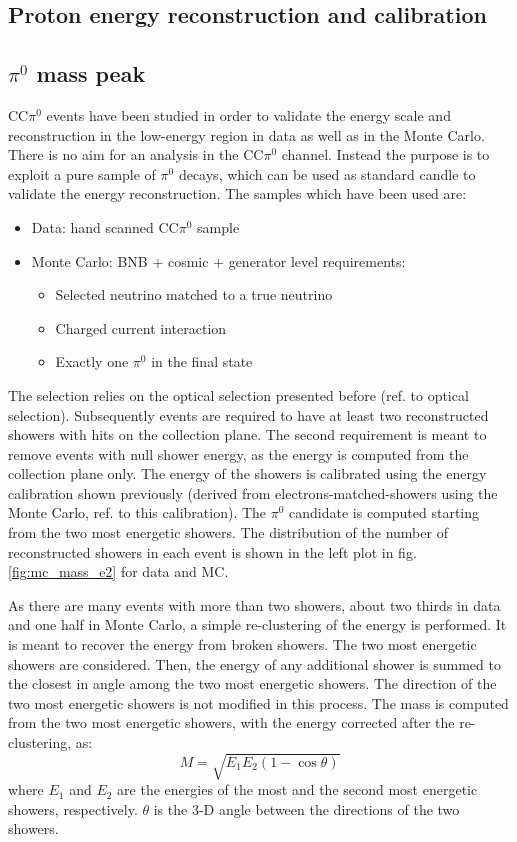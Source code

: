 \documentclass[a4paper]{article}
\begin{document}
\subsection{Proton energy reconstruction and calibration}


\subsection{\texorpdfstring{$\pi^0$}{pi0} mass peak}

CC$\pi^0$ events have been studied in order to validate the energy scale and reconstruction in the low-energy region in data as well as in the Monte Carlo. There is no aim for an analysis in the CC$\pi^0$ channel. Instead the purpose is to exploit a pure sample of $\pi^0$ decays, which can be used as standard candle to validate the energy reconstruction.
The samples which have been used are:
\begin{itemize}
  \item Data: hand scanned CC$\pi^0$ sample
  \item Monte Carlo: BNB + cosmic + generator level requirements:
  	\begin{itemize}
  		\item Selected neutrino matched to a true neutrino
		\item Charged current interaction
		\item Exactly one $\pi^0$ in the final state
  	\end{itemize}
\end{itemize}
The selection relies on the optical selection presented before (ref. to optical selection). Subsequently events are required to have at least two reconstructed showers with hits on the collection plane. The second requirement is meant to remove events with null shower energy, as the energy is computed from the collection plane only. The energy of the showers is calibrated using the energy calibration shown previously (derived from electrons-matched-showers using the Monte Carlo, ref. to this calibration).
The $\pi^0$ candidate is computed starting from the two most energetic showers. The distribution of the number of reconstructed showers in each event is shown in the left plot in fig. \ref{fig:mc_mass_e2} for data and MC.

As there are many events with more than two showers, about two thirds in data and one half in Monte Carlo, a simple re-clustering of the energy is performed. It is meant to recover the energy from broken showers. The two most energetic showers are considered. Then, the energy of any additional shower is summed to the closest in angle among the two most energetic showers. The direction of the two most energetic showers is not modified in this process. The mass is computed from the two most energetic showers, with the energy corrected after the re-clustering, as:
\[ M = \sqrt{E_1 E_2 (1 - \cos\theta)} \]\textbf{}
where $E_1$ and $E_2$ are the energies of the most and the second most energetic showers, respectively. $\theta$ is the 3-D angle between the directions of the two showers.
\end{document}
